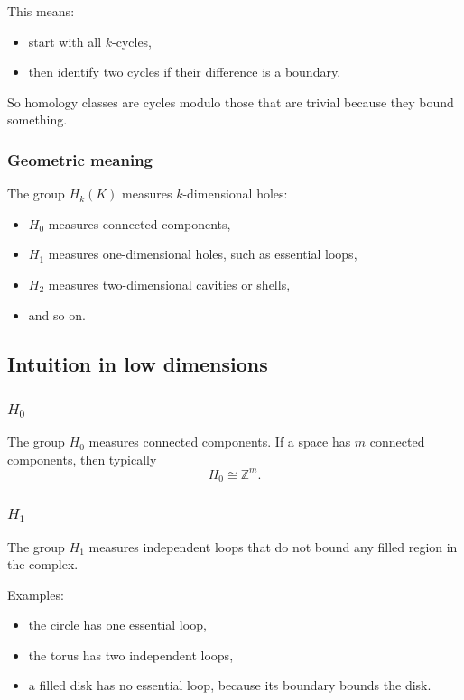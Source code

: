 \documentclass[12pt,a4paper]{article}
\theoremstyle{notespace}
\begin{document}
This means:
\begin{itemize}
	\item start with all \(k\)-cycles,
	\item then identify two cycles if their difference is a boundary.
\end{itemize}

So homology classes are cycles modulo those that are trivial because they bound something.

\subsubsection{Geometric meaning}

The group \(H_k(K)\) measures \(k\)-dimensional holes:
\begin{itemize}
	\item \(H_0\) measures connected components,
	\item \(H_1\) measures one-dimensional holes, such as essential loops,
	\item \(H_2\) measures two-dimensional cavities or shells,
	\item and so on.
\end{itemize}

\subsection{Intuition in low dimensions}

\subsubsection{\texorpdfstring{$H_0$}{H0}}

The group \(H_0\) measures connected components. If a space has \(m\) connected components, then typically
\[
H_0\cong \mathbb{Z}^m.
\]

\subsubsection{\texorpdfstring{$H_1$}{H1}}

The group \(H_1\) measures independent loops that do not bound any filled region in the complex.

Examples:
\begin{itemize}
	\item the circle has one essential loop,
	\item the torus has two independent loops,
	\item a filled disk has no essential loop, because its boundary bounds the disk.
\end{itemize}
\end{document}
